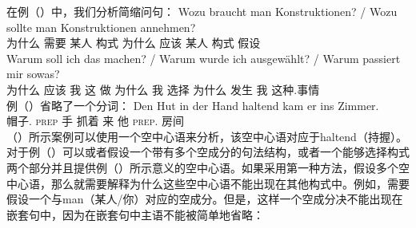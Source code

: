 \begin{exe}
\begin{xlist}[iv.]
\begin{exe}
\begin{xlist}[iv.]
\z
在例（）中，我们分析简缩问句：
\eal
\ex 
\gll Wozu braucht man Konstruktionen? / Wozu sollte man Konstruktionen annehmen?\\
     为什么 需要 某人 构式 {} 为什么 应该 某人 构式 假设\\
\ex 
\gll Warum soll ich das machen? / Warum wurde ich ausgewählt? / Warum passiert mir sowas?\\
	 为什么 应该 我 这 做 {} 为什么 \passivepst{} 我 选择 {} 为什么 发生 我 这种.事情\\
\zl
例（）省略了一个分词：
\ea
\gll Den Hut in der Hand haltend kam er ins Zimmer.\\
	  帽子.\acc{} \textsc{prep}  手 抓着 来 他 \textsc{prep}. 房间\\
\z
（）所示案例可以使用一个空中心语来分析，该空中心语对应于haltend（持握）。对于例（）可以或者假设一个带有多个空成分的句法结构，或者一个能够选择构式两个部分并且提供例（）所示意义的空中心语。如果采用第一种方法，假设多个空中心语，那么就需要解释为什么这些空中心语不能出现在其他构式中。例如，需要假设一个与man（某人/你）对应的空成分。但是，这样一个空成分决不能出现在嵌套句中，因为在嵌套句中主语不能被简单地省略：

\end{xlist}
\end{exe}
\end{xlist}
\end{exe}
